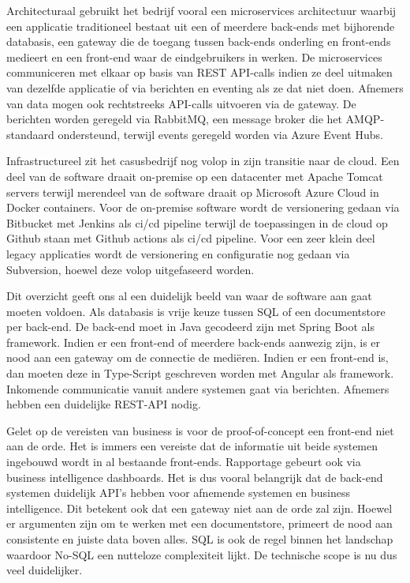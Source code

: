 Architecturaal gebruikt het bedrijf vooral een microservices architectuur waarbij een applicatie traditioneel bestaat uit een of meerdere back-ends met bijhorende databasis, een gateway die de toegang tussen back-ends onderling en front-ends medieert en een front-end waar de eindgebruikers in werken. De microservices communiceren met elkaar op basis van REST API-calls indien ze deel uitmaken van dezelfde applicatie of via berichten en eventing als ze dat niet doen. Afnemers van data mogen ook rechtstreeks API-calls uitvoeren via de gateway. De berichten worden geregeld via RabbitMQ, een message broker die het AMQP-standaard ondersteund, terwijl events geregeld worden via Azure Event Hubs.\newline

Infrastructureel zit het casusbedrijf nog volop in zijn transitie naar de cloud. Een deel van de software draait on-premise op een datacenter met Apache Tomcat servers terwijl merendeel van de software draait op Microsoft Azure Cloud in Docker containers. Voor de on-premise software wordt de versionering gedaan via Bitbucket met Jenkins als ci/cd pipeline terwijl de toepassingen in de cloud op Github staan met Github actions als ci/cd pipeline. Voor een zeer klein deel legacy applicaties wordt de versionering en configuratie nog gedaan via Subversion, hoewel deze volop uitgefaseerd worden. \newline

Dit overzicht geeft ons al een duidelijk beeld van waar de software aan gaat moeten voldoen. Als databasis is vrije keuze tussen SQL of een documentstore per back-end. De back-end moet in Java gecodeerd zijn met Spring Boot als framework. Indien er een front-end of meerdere back-ends aanwezig zijn, is er nood aan een gateway om de connectie de mediëren. Indien er een front-end is, dan moeten deze in Type-Script geschreven worden met Angular als framework. Inkomende communicatie vanuit andere systemen gaat via berichten. Afnemers hebben een duidelijke REST-API nodig. \newline

Gelet op de vereisten van business is voor de proof-of-concept een front-end niet aan de orde. Het is immers een vereiste dat de informatie uit beide systemen ingebouwd wordt in al bestaande front-ends. Rapportage gebeurt ook via business intelligence dashboards. Het is dus vooral belangrijk dat de back-end systemen duidelijk API’s hebben voor afnemende systemen en business intelligence. Dit betekent ook dat een gateway niet aan de orde zal zijn. Hoewel er argumenten zijn om te werken met een documentstore, primeert de nood aan consistente en juiste data boven alles. SQL is ook de regel binnen het landschap waardoor No-SQL een nutteloze complexiteit lijkt.  De technische scope is nu dus veel duidelijker.
